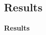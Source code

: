 \documentclass[aspectratio=169,xcolor=dvipsnames]{beamer}
\begin{document}


\subsection{Results}

\begin{frame}  %
    \Large{\centerline{\textbf{Results}}}
\end{frame}
\end{document}
